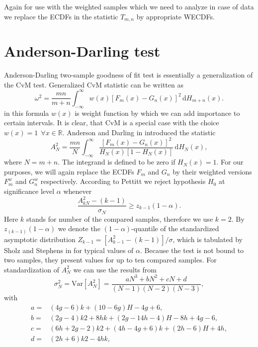 Again for use with the weighted samples which we need to analyze in case of \dzero data we replace the ECDFs in the statistic $T_{m,n}$ by appropriate WECDFs.

\section{Anderson-Darling test}
Anderson-Darling two-sample goodness of fit test is essentially a generalization of the CvM test. Generalized CvM statistic can be written as 
\begin{equation}
\omega^2 = \frac{mn}{m+n} \int_{-\infty}^\infty w(x) \left[F_m(x) - G_n(x) \right]^2 \,\mathrm{d} H_{m+n}(x).
\end{equation}
in this formula $w(x)$ is weight function by which we can add importance to certain intervals. It is clear, that CvM is a special case with the choice $w(x) = 1 \:\: \forall x \in \mathbb{R}.$ Anderson and Darling   in \cite{AndersonDarling1954} introduced the statistic 
\begin{equation}
A^2_{N} = \frac{mn}{N} \int_{-\infty}^\infty \frac{\left[F_m(x) - G_n(x) \right]^2}{H_{N}(x)\left[ 1 - H_{N}(x)\right]} \,\mathrm{d} H_{N}(x),
\end{equation}
where $N = m+n$. The integrand is defined to be zero if $H_{N}(x) = 1$. For our purposes, we will again replace the ECDFs $F_m$ and $G_n$ by their weighted versions $F_m^w$ and $G_n^w$ respectively.
According to Pettitt \cite{Pettitt1976} we reject hypothesis $H_0$ at significance level $\alpha$ whenever
\begin{equation}
\frac{A^2_{kN} - (k-1)}{\sigma_{N}} \geq z_{k-1}(1-\alpha).
\end{equation}
Here $k$ stands for number of the compared samples, therefore we use $k=2$. By $z_{(k-1)}(1-\alpha)$ we denote the $(1-\alpha)$-quantile of the standardized asymptotic distribution $Z_{k-1} = [A^2_{k-1} - (k-1)]/{\sigma}$, which is tabulated by Sholz and Stephens in \cite{Sholz1986} for typical values of $\alpha$.  Because the test is not bound to two samples, they present values for up to ten compared samples.
For standardization of $A^2_{N}$ we can use the results from \cite{Sholz1986} 
\begin{equation}
\sigma_{N}^2 = \mathrm{Var}\left[ A^2_{N}\right] = \frac{ aN^3 + bN^2 + cN + d
 }{(N-1)(N-2)(N-3)},
\end{equation}
with 
\begin{align*}
a = & (4g - 6)k + (10 - 6g)H - 4g + 6, \\
b = &(2g - 4)k 2 + 8hk + (2g - 14h - 4)H - 8h + 4g - 6, \\
c = &(6h + 2g - 2)k2 + (4h - 4g + 6)k + (2h - 6)H + 4h,  \\
d = &(2h + 6)k 2 - 4hk, 
\end{align*}
